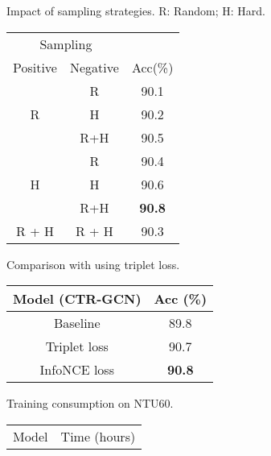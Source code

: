 \documentclass{article} \usepackage{iclr2023_conference,times}
\begin{document}
\begin{minipage}{\textwidth}
\begin{minipage}[t]{0.3\textwidth}
\centering
\makeatletter{}
\setlength\tabcolsep{2.5pt}
   \scriptsize
   \caption{Impact of sampling strategies. R: Random; H: Hard.}
    \begin{tabular}{c|c||c}
\multicolumn{2}{c||}{\cellcolor{gray!30} Sampling} & \cellcolor{gray!30} \\\cline{1-2}
       \cellcolor{gray!30} Positive & \cellcolor{gray!30} Negative & \multirow{-2}{*}{\cellcolor{gray!30} Acc(\%)} \\
       \hline \hline
        \multirow{3}{*}{R} & R & 90.1 \\
         & H & 90.2 \\
         & R+H & 90.5 \\
        \hline
        \multirow{3}{*}{H} & R & 90.4 \\
         & H & 90.6 \\
         & R+H & \textbf{90.8} \\
        \hline
        R + H & R + H & 90.3 \\\hline
    \end{tabular}
    \label{table:sampling}
\end{minipage}
\hspace{3mm}
\begin{minipage}[t]{0.25\textwidth}
\centering
\setlength\tabcolsep{2pt}
\makeatletter{}
\setlength\tabcolsep{2.5pt}
   \scriptsize
   \caption{Comparison with using triplet loss.}
    \begin{tabular}{c||c}
\rowcolor{gray!30} Model (CTR-GCN) & Acc (\%) \\
       \hline \hline
        Baseline & 89.8 \\\hline
        Triplet loss & 90.7 \\
        InfoNCE loss & \textbf{90.8} \\
        \hline
    \end{tabular}
    \label{table:info_triplet_loss}
\end{minipage}
\hspace{3mm}
\begin{minipage}[t]{0.43\textwidth}
\centering
\setlength\tabcolsep{2pt}
\makeatletter{}
\setlength\tabcolsep{2.5pt}
   \scriptsize
   \caption{Training consumption on NTU60.}
    \begin{tabular}{c||c}
\rowcolor{gray!30} Model & Time (hours) \\

\end{tabular}
\end{minipage}
\end{minipage}
\end{document}
